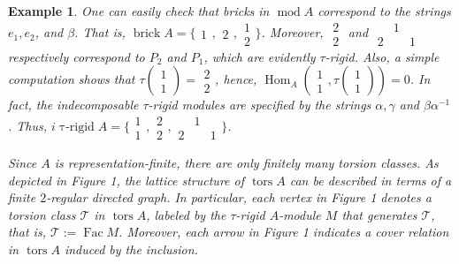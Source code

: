 \documentclass{amsart}
\theoremstyle{thmstyle}
\theoremstyle{exstyle}
\newtheorem{example}[thm]{Example}
\theoremstyle{defstyle}
\theoremstyle{remstyle}
\theoremstyle{remstyle}
\newcommand{\Hom}{\operatorname{Hom}}
\newcommand{\Fac}{\operatorname{Fac}}
\newcommand{\taurigid}{\operatorname{\tau-rigid}}
\DeclareMathOperator*{\modu}{mod}
\DeclareMathOperator*{\brick}{brick}
\DeclareMathOperator*{\tors}{tors}
\begin{document}
\begin{example}
One can easily check that bricks in $\modu A$ correspond to the strings $e_1, e_2$, and  $\beta$. That is, $\brick A=\{{\begin{smallmatrix} 1\end{smallmatrix}}, {\begin{smallmatrix} 2\end{smallmatrix}}, {\begin{smallmatrix} 1\\2\end{smallmatrix}} \}$. Moreover, ${\begin{smallmatrix} 2\\2\end{smallmatrix}}$ and ${\begin{smallmatrix} & 1& \\2& &1\end{smallmatrix}}$ respectively correspond to $P_2$ and $P_1$, which are evidently $\tau$-rigid. Also, a simple computation shows that $\tau({\begin{smallmatrix} 1\\1\end{smallmatrix}})= {\begin{smallmatrix} 2\\2\end{smallmatrix}}$, hence, $\Hom_A({\begin{smallmatrix} 1\\1\end{smallmatrix}}, \tau({\begin{smallmatrix} 1\\1\end{smallmatrix}}))=0$. In fact, the indecomposable $\tau$-rigid modules are specified by the strings $\alpha, \gamma$ and $\beta \alpha^{-1}$. Thus,  $\textit{i}\taurigid A=\{ {\begin{smallmatrix} 1\\1\end{smallmatrix}},{\begin{smallmatrix} 2\\2\end{smallmatrix}}, {\begin{smallmatrix} & 1& \\2& &1\end{smallmatrix}} \}$.

Since $A$ is representation-finite, there are only finitely many torsion classes. As depicted in Figure 1, the lattice structure of $\tors A$ can be described in terms of a finite $2$-regular directed graph. In particular, each vertex in Figure 1 denotes a torsion class $\mathcal{T}$ in $\tors A$, labeled by the $\tau$-rigid $A$-module $M$ that generates $\mathcal{T}$, that is, $\mathcal{T}:=\Fac M$. Moreover, each arrow in Figure 1 indicates a cover relation in $\tors A$ induced by the inclusion.


\end{example}
\end{document}
